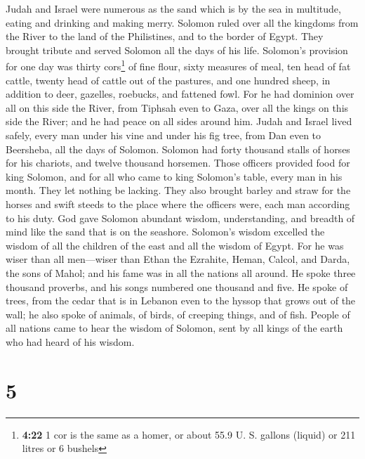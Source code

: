  Judah and Israel were numerous as the sand which is by
the sea in multitude, eating and drinking and making merry.
 Solomon ruled over all the kingdoms from the River to
the land of the Philistines, and to the border of Egypt. They brought
tribute and served Solomon all the days of his life. 
Solomon's provision for one day was thirty cors\footnote{\textbf{4:22} 1
  cor is the same as a homer, or about 55.9 U. S. gallons (liquid) or
  211 litres or 6 bushels} of fine flour, sixty measures of meal,
 ten head of fat cattle, twenty head of cattle out of the
pastures, and one hundred sheep, in addition to deer, gazelles,
roebucks, and fattened fowl.  For he had dominion over
all on this side the River, from Tiphsah even to Gaza, over all the
kings on this side the River; and he had peace on all sides around him.
 Judah and Israel lived safely, every man under his vine
and under his fig tree, from Dan even to Beersheba, all the days of
Solomon.  Solomon had forty thousand stalls of horses for
his chariots, and twelve thousand horsemen.  Those
officers provided food for king Solomon, and for all who came to king
Solomon's table, every man in his month. They let nothing be lacking.
 They also brought barley and straw for the horses and
swift steeds to the place where the officers were, each man according to
his duty.  God gave Solomon abundant wisdom,
understanding, and breadth of mind like the sand that is on the
seashore.  Solomon's wisdom excelled the wisdom of all
the children of the east and all the wisdom of Egypt. 
For he was wiser than all men---wiser than Ethan the Ezrahite, Heman,
Calcol, and Darda, the sons of Mahol; and his fame was in all the
nations all around.  He spoke three thousand proverbs,
and his songs numbered one thousand and five.  He spoke
of trees, from the cedar that is in Lebanon even to the hyssop that
grows out of the wall; he also spoke of animals, of birds, of creeping
things, and of fish.  People of all nations came to hear
the wisdom of Solomon, sent by all kings of the earth who had heard of
his wisdom.

\hypertarget{section-4}{%
\section{5}\label{section-4}}

